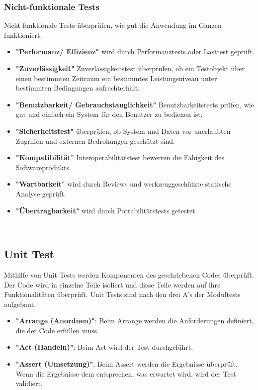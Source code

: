 \subsubsection{Nicht-funktionale Tests}
Nicht funktionale Tests überprüfen, wie gut die Anwendung im Ganzen funktioniert.
\begin{itemize}
  \item \textbf{"Performanz/ Effizienz"}
  wird durch Performanztests oder Lasttest geprüft.
  \item \textbf{"Zuverlässigkeit"}
  Zuverlässigkeitstest überprüfen, ob ein Testobjekt über einen bestimmten Zeitraum ein bestimmtes 
  Leistungsniveau unter bestimmten Bedingungen aufrechterhält.
  \item \textbf{"Benutzbarkeit/ Gebrauchstauglichkeit"}
  Benutzbarkeitstests prüfen, wie gut und einfach ein System für den Benutzer zu bedienen ist.
  \item \textbf{"Sicherheitstest"}
  überprüfen, ob System und Daten vor unerlaubten Zugriffen und externen Bedrohungen geschützt sind.
  \item \textbf{"Kompatibilität"}
  Interoperabilitätstest bewerten die Fähigkeit des Softwareprodukts.
  \item \textbf{"Wartbarkeit"}
  wird durch Reviews und werkzeuggeschützte statische Analyse geprüft.
  \item \textbf{"Übertragbarkeit"}
  wird durch Portabilitätstests getestet.
\end{itemize}
~\cite{software_testing_methoden}

\subsection{Unit Test}
Mithilfe von Unit Tests werden Komponenten des geschriebenen Codes überprüft. 
Der Code wird in einzelne Teile isoliert und diese Teile werden auf ihre Funktionalitäten überprüft.
\newline
\newline
Unit Tests sind nach den drei A's der Modultests aufgebaut.
\begin{itemize}
  \item \textbf{"Arrange (Anordnen)"}:
  Beim Arrange werden die Anforderungen definiert, die der Code erfüllen muss.
  \item \textbf{"Act (Handeln)"}:
  Beim Act wird der Test durchgeführt.
  \item \textbf{"Assert (Umsetzung)"}:
  Beim Assert werden die Ergebnisse überprüft. Wenn die Ergebnisse dem entsprechen, was erwartet
  wird, wird der Test validiert.
\end{itemize}
~\cite{unit_test}

